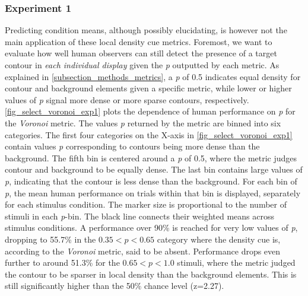 \documentclass[12pt]{article}
\begin{document}
\subsubsection{Experiment 1}

Predicting condition means, although possibly elucidating, is however not the main application of these local density cue metrics. Foremost, we want to evaluate how well human observers can still detect the presence of a target contour in \emph{each individual display} given the \emph{p} outputted by each metric. As explained in \autoref{subsection_methods_metrics}, a \emph{p} of 0.5 indicates equal density for contour and background elements given a specific metric, while lower or higher values of \emph{p} signal more dense or more sparse contours, respectively.\\

\autoref{fig_select_voronoi_exp1} plots the dependence of human performance on \emph{p} for the \emph{Voronoi} metric. The values \emph{p} returned by the metric are binned into six categories. The first four categories on the X-axis in \autoref{fig_select_voronoi_exp1} contain values \emph{p} corresponding to contours being more dense than the background. The fifth bin is centered around a \emph{p} of 0.5, where the metric judges contour and background to be equally dense. The last bin contains large values of \emph{p}, indicating that the contour is less dense than the background. For each bin of \emph{p}, the mean human performance on trials within that bin is displayed, separately for each stimulus condition. The marker size is proportional to the number of stimuli in each \emph{p}-bin. The black line connects their weighted means across stimulus conditions. A performance over 90\% is reached for very low values of \emph{p}, dropping to 55.7\% in the $0.35 < p < 0.65$ category where the density cue is, according to the \emph{Voronoi} metric, said to be absent. Performance drops even further to around 51.3\% for the $0.65 < p <1.0$ stimuli, where the metric judged the contour to be sparser in local density than the background elements. This is still significantly higher than the 50\% chance level (z=2.27).\\
\end{document}
